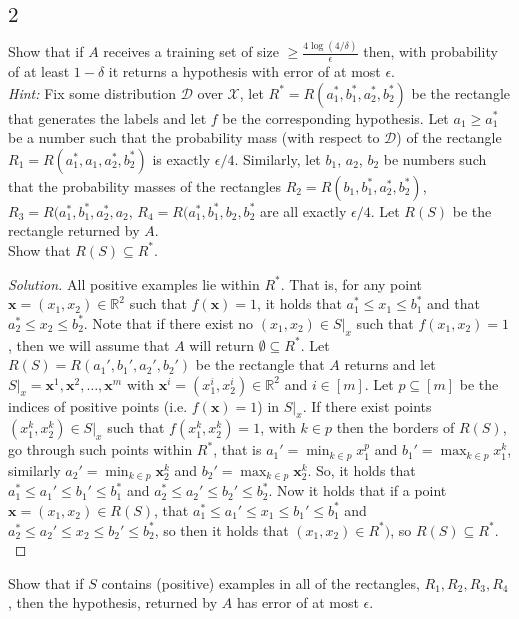 \documentclass[10pt, a4paper, twoside]{amsart}
\newcommand{\R}{\ensuremath{\mathbb{R}}}
\newenvironment{solution}
               {\let\oldqedsymbol=\qedsymbol
                \renewcommand{\qedsymbol}{$\blacktriangleleft$}
                \begin{proof}[Solution]}
               {\end{proof}
                \renewcommand{\qedsymbol}{\oldqedsymbol}}
\begin{document}
\subsection*{$2$}
Show that if $A$ receives a training set of size $\geq \frac{4 \log (4/\delta)}{\epsilon}$ then, with probability of at least $1-\delta$ it returns a hypothesis with error  of at most $\epsilon$.\\
\textit{Hint:} Fix some distribution $\mathcal{D}$ over $\mathcal{X}$, let $R^* = R(a_1^*,b_1^*,a_2^*,b_2^*)$ be the rectangle that generates the labels and let $f$ be the corresponding hypothesis. Let $a_1 \geq a_1^*$ be a number such that the probability mass (with respect to $\mathcal{D}$) of the rectangle $R_1 = R(a_1^*,a_1,a_2^*,b_2^*)$ is exactly $\epsilon/4$. Similarly, let $b_1$, $a_2$, $b_2$ be numbers such that the probability masses of the rectangles $R_2 = R(b_1,b_1^*,a_2^*,b_2^*)$, $R_3 =  R(a_1^*,b_1^*,a_2^*,a_2$, $R_4 =  R(a_1^*,b_1^*,b_2,b_2^*$ are all exactly $\epsilon/4$. Let $R(S)$ be the rectangle returned by $A$.\\
Show that $R(S)\subseteq R^*$.
\begin{solution}
All positive examples lie within $R^*$. That is, for any point $\mathbf{x} = (x_1,x_2) \in \R^2$ such that $f(\mathbf{x})=1$, it holds that $a_1^*\leq x_1 \leq b_1^*$ and that $a_2^*\leq x_2 \leq b_2^*$. Note that if there exist no $(x_1,x_2) \in S|_x$ such that $f(x_1,x_2)=1$, then we will assume that $A$ will return $\emptyset \subseteq R^*$. Let $R(S) = R(a_1',b_1',a_2',b_2')$ be the rectangle that $A$ returns and let $S|_x = {\mathbf{x}^1, \mathbf{x}^2,\ldots, \mathbf{x}^m}$ with $\mathbf{x}^i = (x_1^i,x_2^i) \in \R^2$ and $i \in [m]$. Let $p \subseteq [m]$ be the indices of positive points (i.e. $f(\mathbf{x})=1$) in $S|_x$. If there exist points $(x^k_1,x^k_2)\in S|_x$ such that $f(x^k_1,x^k_2)=1$, with $k \in p$ then the borders of $R(S)$, go through such points within $R^*$, that is $a_1' = \min_{k\in p} x^p_1$ and $b_1' = \max_{k\in p} x^k_1$, similarly $a_2' = \min_{k\in p} \mathbf{x}^k_2$ and $b_2' = \max_{k\in p} \mathbf{x}^k_2$. So, it holds that $a_1^*\leq a_1'\leq b_1' \leq b_1^*$ and $a_2^* \leq a_2' \leq b_2' \leq b_2^*$. Now it holds that if a point $\mathbf{x} = (x_1, x_2)\in R(S)$, that $a_1^*\leq a_1'\leq x_1 \leq b_1' \leq b_1^*$ and $a_2^* \leq a_2'\leq x_2 \leq b_2' \leq b_2^*$, so then it holds that $(x_1,x_2) \in R^*)$, so $R(S) \subseteq R^*$.\\
\end{solution}
Show that if $S$ contains (positive) examples in all of the rectangles, $R_1, R_2, R_3, R_4$, then the hypothesis, returned by $A$ has error of at most $\epsilon$. \\
\end{document}
